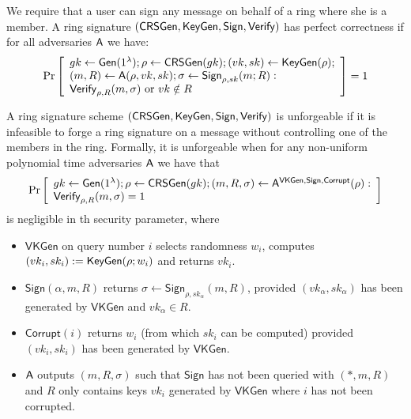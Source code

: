 \begin{definition}
We require that a user can sign any message on behalf of a ring where she is a member. A ring signature $(\mathsf{CRSGen},\allowbreak \mathsf{KeyGen}, \mathsf{Sign}, \mathsf{Verify})$
has perfect correctness if for all adversaries $\mathsf{A}$ we have:
$$
\Pr\left[\begin{array}{l}
gk\gets\mathsf{Gen}(1^\lambda);\rho\gets\mathsf{CRSGen}(gk);(vk,sk)\gets\mathsf{KeyGen}(\rho);\\
(m,R)\gets\mathsf{A}(\rho,vk,sk);\sigma\gets\mathsf{Sign}_{\rho,sk}(m;R):\\
\mathsf{Verify}_{\rho,R}(m,\sigma)\text{ or }vk\notin R
\end{array}\right]=1
$$
\end{definition}

\begin{definition}
A ring signature scheme $(\mathsf{CRSGen}, \mathsf{KeyGen}, \mathsf{Sign}, \mathsf{Verify})$
is unforgeable if it is infeasible to forge a ring
signature on a message without controlling one of the members in the ring. Formally, it
is unforgeable when for any non-uniform polynomial
time adversaries $\mathsf{A}$ we have that
$$
\Pr\left[\begin{array}{l}
gk\gets\mathsf{Gen}(1^\lambda);\rho\gets\mathsf{CRSGen}(gk);(m,R,\sigma)\gets\mathsf{A}^{\mathsf{VKGen},\mathsf{Sign},\mathsf{Corrupt}}(\rho):\\
\mathsf{Verify}_{\rho,R}(m,\sigma)=1
\end{array}\right]
$$
is negligible in th security parameter, where

\begin{itemize}
\item $\mathsf{VKGen}$ on query number $i$ selects randomness $w_i$, computes $(vk_i,sk_i):= \mathsf{KeyGen}(\rho; w_i)$
and returns $vk_i$.
\item $\mathsf{Sign}(\alpha, m, R)$ returns $\sigma \gets \mathsf{Sign}_{\rho,sk_\alpha}(m, R)$, provided $(vk_\alpha, sk_\alpha)$ has been generated
by $\mathsf{VKGen}$ and $vk_\alpha\in R$.
\item $\mathsf{Corrupt}(i)$ returns $w_i$ (from which $sk_i$ can be computed) provided $(vk_i, sk_i)$ has
been generated by $\mathsf{VKGen}$.
\item $\mathsf{A}$ outputs $(m, R, \sigma)$ such that $\mathsf{Sign}$ has not been queried with $(*, m, R)$ and $R$
only contains keys $vk_i$ generated by $\mathsf{VKGen}$ where $i$ has not been corrupted.
\end{itemize}
\end{definition}

